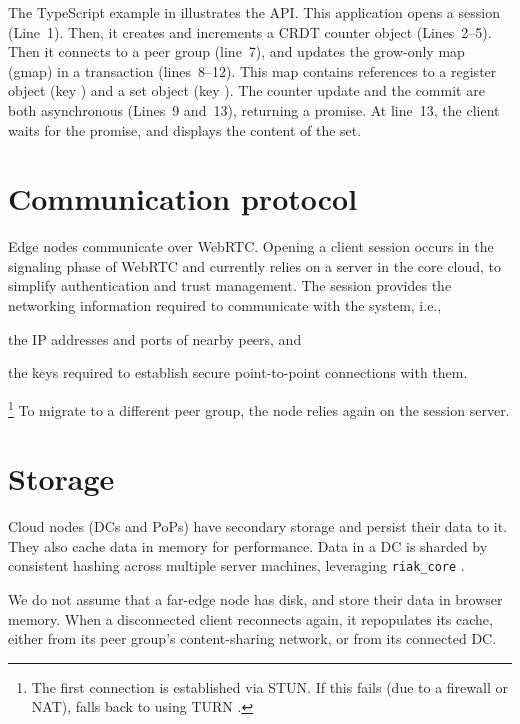 The TypeScript example in  illustrates the API.
This application opens a session (Line~1).
Then, it creates and increments a CRDT counter object (Lines~2--5).
Then it connects to a peer group (line~7), and updates the grow-only map
(gmap) \code{{\color{RoyalPurple}{``myMap''}}} in a transaction
(lines~8--12).
This map contains references to a register object (key
\code{{\color{RoyalPurple}{``a''}}}) and a set object (key
\code{{\color{RoyalPurple}{``e''}}}).
The counter update and the commit are both asynchronous 
(Lines~9 and~13), returning a promise.
At line~13, the client waits for the promise, and displays the content
of the set.

\section{Communication protocol}

Edge nodes communicate over WebRTC\@.
Opening a client session occurs in the signaling phase of WebRTC and
currently relies on a server in the core cloud, to simplify
authentication and trust management.
The session provides the networking information required to communicate
with the system, i.e.,
\begin{inparablank}
  \item the IP addresses and ports  of nearby peers, and
  \item the keys required to establish secure point-to-point connections
    with them.
\end{inparablank}%
\footnote{
%
  The first connection is established via STUN.
  If this fails (due to a firewall or NAT), \system{} falls back to
  using TURN \cite{wing2008session}.
}
To migrate to a different peer group, the node relies again on the
session server.


\section{Storage}
\label{sec:object-store}

Cloud nodes (DCs and PoPs) have secondary storage and persist their data
to it.
They also cache data in memory for performance.
Data in a DC is sharded by consistent hashing across multiple server
machines, leveraging \texttt{riak\_core} \cite{riak-core}.

We do not assume that a far-edge node has disk, and store their data in
browser memory.
When a disconnected client reconnects again, it repopulates its cache,
either from its peer group's content-sharing network, or from its
connected DC\@.

